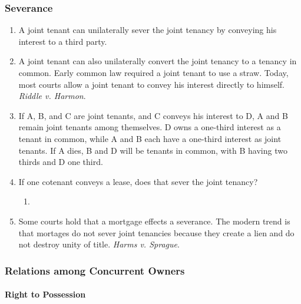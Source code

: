 \subsubsection{Severance}

\begin{enumerate}
    \item A joint tenant can unilaterally sever the joint tenancy by conveying 
    his interest to a third party.
    \item A joint tenant can also unilaterally convert the joint tenancy to a 
    tenancy in common. Early common law required a joint tenant to use a 
    straw. Today, most courts allow a joint tenant to convey his interest 
    directly to himself. \emph{Riddle v. Harmon}.
    \item If A, B, and C are joint tenants, and C conveys his interest to D, A 
    and B remain joint tenants among themselves. D owns a one-third interest 
    as a tenant in common, while A and B each have a one-third interest as 
    joint tenants. If A dies, B and D will be tenants in common, with B having 
    two thirds and D one third.
    \item If one cotenant conveys a lease, does that sever the joint tenancy?
    \begin{enumerate}
        \item %
    \end{enumerate}
    \item Some courts hold that a mortgage effects a severance. The modern 
    trend is that mortages do not sever joint tenancies because they create a 
    lien and do not destroy unity of title. \emph{Harms v. Sprague}.
\end{enumerate}

\subsubsection{Relations among Concurrent Owners}

\paragraph{Right to Possession}

